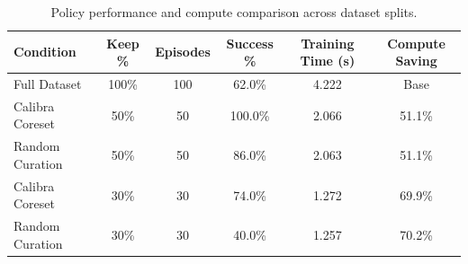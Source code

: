 \begin{table}[h]
\centering
\caption{Policy performance and compute comparison across dataset splits.}
\label{table:prune_performance}
\begin{tabular}{lccccc}
\hline
\textbf{Condition} & \textbf{Keep \%} & \textbf{Episodes} & \textbf{Success \%} & \textbf{Training Time (s)} & \textbf{Compute Saving} \\ \hline
Full Dataset & 100\% & 100 & 62.0\% & 4.222 & Base \\ \hline
Calibra Coreset & 50\% & 50 & 100.0\% & 2.066 & 51.1\% \\
Random Curation & 50\% & 50 & 86.0\% & 2.063 & 51.1\% \\ \hline
Calibra Coreset & 30\% & 30 & 74.0\% & 1.272 & 69.9\% \\
Random Curation & 30\% & 30 & 40.0\% & 1.257 & 70.2\% \\ \hline
\end{tabular}
\end{table}
